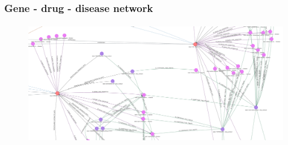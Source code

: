 \documentclass[aspectratio=169,xcolor=dvipsnames]{beamer}
\begin{document}
\begin{frame}
  \frametitle{Gene - drug - disease network}
  \framesubtitle{}
  \begin{figure}
    \begin{center}
      \includegraphics[height=0.8\textheight]{gene-drug-disease.jpeg}
    \end{center}
  \end{figure}
\end{frame}






\end{document}
